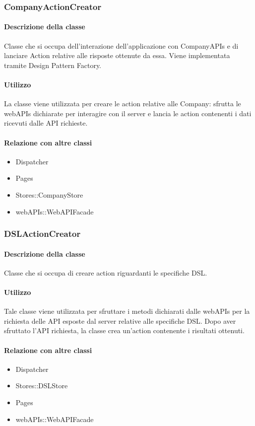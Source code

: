 \subsubsection{CompanyActionCreator}
\paragraph*{Descrizione della classe}
Classe che si occupa dell'interazione dell'applicazione con CompanyAPIs e di lanciare Action relative alle risposte ottenute da essa. Viene implementata tramite Design Pattern Factory.
\paragraph*{Utilizzo}
La classe viene utilizzata per creare le action relative alle Company: sfrutta le webAPIs dichiarate per interagire con il server e lancia le action contenenti i dati ricevuti dalle API richieste.

\paragraph*{Relazione con altre classi}
\begin{itemize}
\item Dispatcher
\item Pages
\item Stores::CompanyStore
\item webAPIs::WebAPIFacade
\end{itemize}

\subsubsection{DSLActionCreator}
\paragraph*{Descrizione della classe}
Classe che si occupa di creare action riguardanti le specifiche DSL.
\paragraph*{Utilizzo}
Tale classe viene utilizzata per sfruttare i metodi dichiarati dalle webAPIs per la richiesta delle API esposte dal server relative alle specifiche DSL. Dopo aver sfruttato l'API richiesta, la classe crea un'action contenente i risultati ottenuti.

\paragraph*{Relazione con altre classi}
\begin{itemize}
\item Dispatcher
\item Stores::DSLStore
\item Pages
\item webAPIs::WebAPIFacade
\end{itemize}

